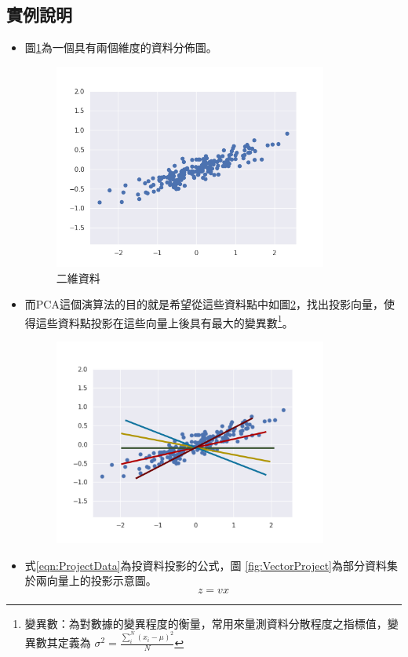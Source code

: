 \subsection{實例說明}

\begin{itemize}
	\item
	      圖\ref{fig:PcaDemostrate}為一個具有兩個維度的資料分佈圖。


	      \begin{figure}[h]
		      \centering
		      \includegraphics[width=9cm]{pic/pca_demostrate.png}
		      \caption{二維資料}
		      \label{fig:PcaDemostrate}
	      \end{figure}


	\newpage
	\item
	      而PCA這個演算法的目的就是希望從這些資料點中如圖\ref{fig:PcaVectorToFind}，找出投影向量，使得這些資料點投影在這些向量上後具有最大的變異數\footnote{\noindent 變異數：為對數據的變異程度的衡量，常用來量測資料分散程度之指標值，變異數其定義為 \(\sigma^2=\frac{{}\sum^{N}_{i}(x_i-\mu )^2}{N}\) }。
	      \begin{figure}[h]
		      \centering
		      \includegraphics[width=9cm]{./pic/iVu9zQYG.png}
		      \caption{}
		      \label{fig:PcaVectorToFind}
	      \end{figure}
	\item
		式\ref{eqn:ProjectData}為投資料投影的公式，圖 \ref{fig:VectorProject}為部分資料集於兩向量上的投影示意圖。 
		\begin{equation}
			\label{eqn:ProjectData}
			 z = vx
		\end{equation}



\end{itemize}
